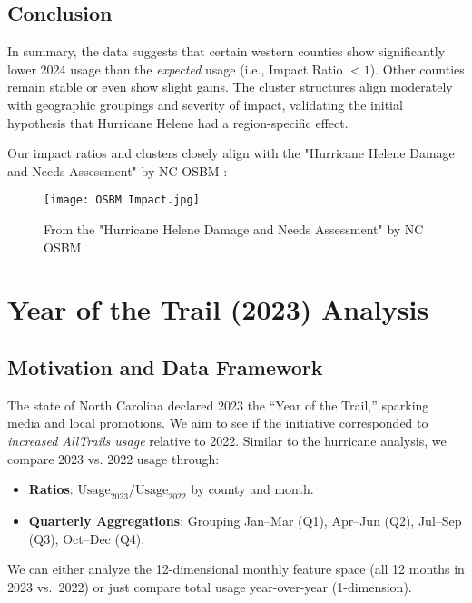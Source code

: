 \documentclass[12pt]{article}
\begin{document}
\subsection{Conclusion}
\label{subsec:helene_conclusion}

In summary, the data suggests that certain western counties show significantly lower 2024 usage than the \emph{expected} usage (i.e., Impact Ratio $<1$). Other counties remain stable or even show slight gains. The cluster structures align moderately with geographic groupings and severity of impact, validating the initial hypothesis that Hurricane Helene had a region-specific effect.

Our impact ratios and clusters closely align with the  "Hurricane Helene Damage and Needs Assessment" by NC OSBM \cite{HeleneOSBM}:
\begin{figure}[H]
    \centering
    \texttt{[image: OSBM Impact.jpg]}
    \caption{From the "Hurricane Helene Damage and Needs Assessment" by NC OSBM}
    \label{fig:enter-label}
\end{figure}

\newpage
\section{Year of the Trail (2023) Analysis}
\label{sec:year_of_trail}

\subsection{Motivation and Data Framework}
The state of North Carolina declared 2023 the ``Year of the Trail,'' sparking media and local promotions. We aim to see if the initiative corresponded to \emph{increased AllTrails usage} relative to 2022. Similar to the hurricane analysis, we compare 2023 vs. 2022 usage through:
\begin{itemize}
    \item \textbf{Ratios}: $\text{Usage}_{2023}/ \text{Usage}_{2022}$ by county and month.
    \item \textbf{Quarterly Aggregations}: Grouping Jan--Mar (Q1), Apr--Jun (Q2), Jul--Sep (Q3), Oct--Dec (Q4).
\end{itemize}
We can either analyze the 12-dimensional monthly feature space (all 12 months in 2023 vs.\ 2022) or just compare total usage year-over-year (1-dimension).
\end{document}
